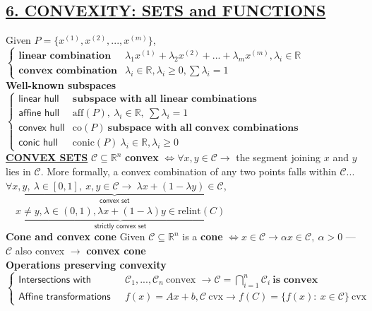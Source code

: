\documentclass[a4paper]{article}
\begin{document}
\subsection*{\color{cyan} 
\textsf{\underline{6. CONVEXITY: SETS and FUNCTIONS}} }
Given $P=\{x^{(1)}, x^{(2)}, ..., x^{(m)}\}$, $\begin{cases}
    \textbf{linear combination} & \lambda_1 x^{(1)}+\lambda_2 x^{(2)}+...+\lambda_m x^{(m)} , \lambda_i \in \mathbb{R}\\
    \textbf{convex combination} & \lambda_i \in \mathbb{R}, \lambda_i \ge 0, \sum \lambda_i = 1
\end{cases}$\\
\textbf{Well-known subspaces} $\begin{cases}
    \textsf{linear hull}&\textbf{subspace with all linear combinations}\\
    \textsf{affine hull}&\text{aff}(P), \ \lambda_i \in \mathbb{R},\ \sum \lambda_i = 1\\
    \textsf{convex hull}&\text{co}(P)\ \textbf{subspace with all convex combinations}\\
    \textsf{conic hull}&\text{conic}(P) \ \lambda_i \in \mathbb{R}, \lambda_i \ge 0
\end{cases}$\\
\textbf{\underline{CONVEX SETS}} $\mathcal{C}\subseteq\mathbb{R}^n$ \textbf{convex} $\iff \forall x,y \in \mathcal{C} \to$ the segment joining $x$ and $y$ lies in $\mathcal{C}$. More formally, a convex combination of any two points falls within $\mathcal{C}$...\\
$\underbrace{\forall x,y, \ \lambda \in [0,1], \ x,y \in \mathcal{C} \to \ \lambda x + (1-\lambda{y})\in\mathcal{C}}_{\textsf{convex set}}$, $\quad\underbrace{x\ne{y}, \lambda \in (0,1), \lambda{x}+(1-\lambda){y} \in \text{relint}(C) }_{\textsf{strictly convex set}}$\\
\textbf{Cone and convex cone} Given $\mathcal{C}\subseteq\mathbb{R}^n$ is a \textbf{cone} $\iff x\in\mathcal{C} \to \alpha{x}\in\mathcal{C}, \ \alpha>0$ --- $\mathcal{C}$ also convex $\to$ \textbf{convex cone}\\
\textbf{Operations preserving convexity}  $\begin{cases}
    \textsf{Intersections with convex sets}& \mathcal{C}_1, ..., \mathcal{C}_n \ \text{convex } \to \mathcal{C}=\bigcap_{i=1}^n{\mathcal{C}_i} \ \textbf{is convex}\\
    \textsf{Affine transformations}&f(x)=Ax+b, \mathcal{C} \ \text{cvx} \to  f(C)=\{f(x): \ x\in\mathcal{C}\}\ \text{cvx}
\end{cases}$\\
\end{document}
